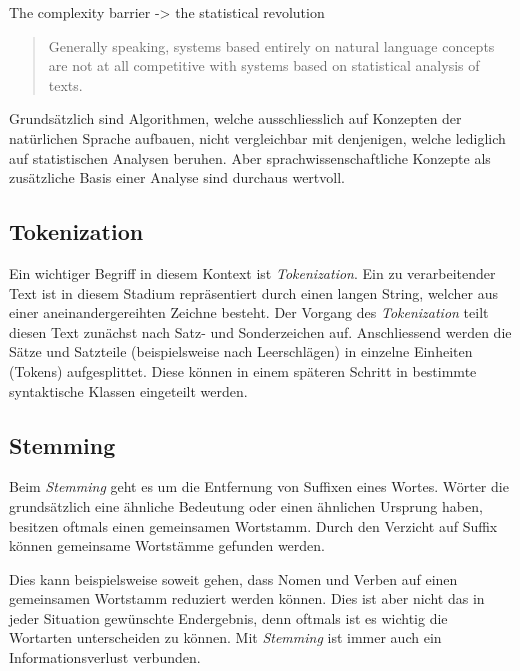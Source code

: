 The complexity barrier -> the statistical revolution

\begin{quote}
Generally speaking, systems based entirely on natural language concepts are not at all competitive with systems based on statistical analysis of texts.
\\\cite{kantor2001foundations}\end{quote}

Grundsätzlich sind Algorithmen, welche ausschliesslich auf Konzepten der natürlichen Sprache aufbauen, nicht vergleichbar mit denjenigen, welche lediglich auf statistischen Analysen beruhen. Aber sprachwissenschaftliche Konzepte als zusätzliche Basis einer Analyse sind durchaus wertvoll.


\subsection{Tokenization}\label{tokenization}

Ein wichtiger Begriff in diesem Kontext ist \textit{Tokenization}. Ein zu verarbeitender Text ist in diesem Stadium repräsentiert durch einen langen String, welcher aus einer aneinandergereihten Zeichne besteht. Der Vorgang des \textit{Tokenization} teilt diesen Text zunächst nach Satz- und Sonderzeichen auf. Anschliessend werden die Sätze und Satzteile (beispielsweise nach Leerschlägen) in einzelne Einheiten (Tokens) aufgesplittet. Diese können in einem späteren Schritt in bestimmte syntaktische Klassen eingeteilt werden.\\\cite{grefenstette1994word}

\subsection{Stemming}
Beim \textit{Stemming} geht es um die Entfernung von Suffixen eines Wortes. Wörter die grundsätzlich eine ähnliche Bedeutung oder einen ähnlichen Ursprung haben, besitzen oftmals einen gemeinsamen Wortstamm. Durch den Verzicht auf Suffix können gemeinsame Wort\-stäm\-me gefunden werden.
\\\cite{porter1980algorithm}

Dies kann beispielsweise soweit gehen, dass Nomen und Verben auf einen gemeinsamen Wortstamm reduziert werden können. Dies ist aber nicht das in jeder Situation gewünschte Endergebnis, denn oftmals ist es wichtig die Wortarten unterscheiden zu können. Mit \textit{Stemming} ist immer auch ein Informationsverlust verbunden. 


